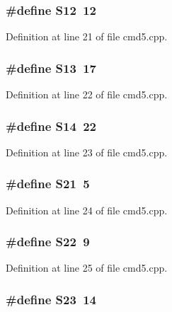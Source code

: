 \subsubsection[{S12}]{\setlength{\rightskip}{0pt plus 5cm}\#define S12~12}\label{cmd5_8cpp_a1ec499cd0e54ecc28c2ac2afea5b038e}


Definition at line 21 of file cmd5.\+cpp.

\subsubsection[{S13}]{\setlength{\rightskip}{0pt plus 5cm}\#define S13~17}\label{cmd5_8cpp_aaeec90429105fb54d853dd4fc7027a54}


Definition at line 22 of file cmd5.\+cpp.

\subsubsection[{S14}]{\setlength{\rightskip}{0pt plus 5cm}\#define S14~22}\label{cmd5_8cpp_a78342b0ccde2ed12fdf19a113cc266cf}


Definition at line 23 of file cmd5.\+cpp.

\subsubsection[{S21}]{\setlength{\rightskip}{0pt plus 5cm}\#define S21~5}\label{cmd5_8cpp_ab6d5354f647a0e7592a1f051fc8377b2}


Definition at line 24 of file cmd5.\+cpp.

\subsubsection[{S22}]{\setlength{\rightskip}{0pt plus 5cm}\#define S22~9}\label{cmd5_8cpp_addad30455da936bc1879ee9c72b46d59}


Definition at line 25 of file cmd5.\+cpp.

\subsubsection[{S23}]{\setlength{\rightskip}{0pt plus 5cm}\#define S23~14}\label{cmd5_8cpp_a6321a8b29628936f76e9e78cf5bda95f}


